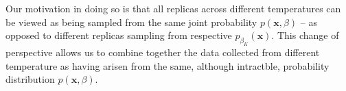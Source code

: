 \documentclass[9pt,twocolumn,twoside]{pnas-new}
\begin{document}
Our motivation in doing so is that all replicas across different temperatures can be viewed as being sampled from the same joint probability $p(\mathbf{x},\beta)$ -- as opposed to different replicas sampling from respective $p_{\beta_K}(\mathbf{x})$. This change of perspective allows us to combine together the data collected from different temperature as having arisen from the same, although intractble, probability distribution $p(\mathbf{x},\beta)$. 
\end{document}
